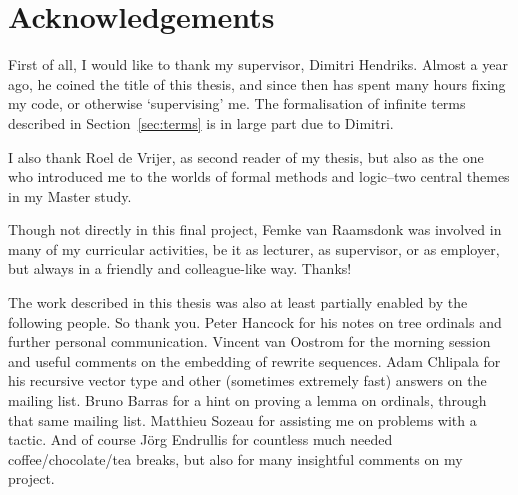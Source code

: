 \chapter*{Acknowledgements}
\thispagestyle{empty}

First of all, I would like to thank my supervisor, Dimitri
Hendriks. Almost a year ago, he coined the title of this thesis, and
since then has spent many hours fixing my \Coq code, or otherwise
`supervising' me. The formalisation of infinite terms described in
Section~\ref{sec:terms} is in large part due to Dimitri.

I also thank Roel de Vrijer, as second reader of my thesis, but also
as the one who introduced me to the worlds of formal methods and
logic--two central themes in my Master study.

Though not directly in this final project, Femke van Raamsdonk was
involved in many of my curricular activities, be it as lecturer, as
supervisor, or as employer, but always in a friendly and
colleague-like way. Thanks!

The work described in this thesis was also at least partially enabled
by the following people. So thank you. Peter Hancock for his notes on
tree ordinals and further personal communication. Vincent van Oostrom
for the morning session and useful comments on the embedding of
rewrite sequences. Adam Chlipala for his recursive vector type and
other (sometimes extremely fast) answers on the \Coq mailing
list. Bruno Barras for a hint on proving a lemma on ordinals, through
that same mailing list. Matthieu Sozeau for assisting me on problems
with a \Coq tactic. And of course J\"org Endrullis for countless much
needed coffee/chocolate/tea breaks, but also for many insightful
comments on my project.

